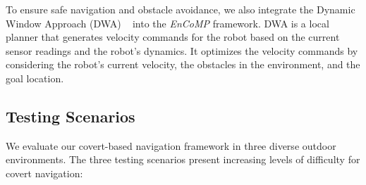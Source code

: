 To ensure safe navigation and obstacle avoidance, we also integrate the Dynamic Window Approach (DWA) ~\cite{fox1997dynamic} into the \textit{EnCoMP} framework. DWA is a local planner that generates velocity commands for the robot based on the current sensor readings and the robot's dynamics. It optimizes the velocity commands by considering the robot's current velocity, the obstacles in the environment, and the goal location.





\subsection{Testing Scenarios}
\label{sec:testingscenario}
We evaluate our covert-based navigation framework in three diverse outdoor environments. The three testing scenarios present increasing levels of difficulty for covert navigation:

